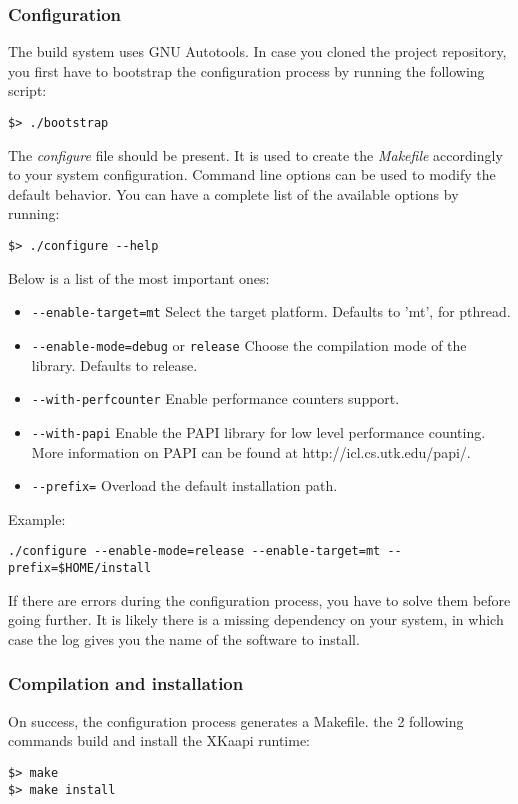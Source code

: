 \documentclass{article}
\begin{document}
\subsubsection{Configuration}
The build system uses GNU Autotools.
In case you cloned the project repository, you first have to bootstrap the
configuration process by running the following script:
\begin{verbatim}
$> ./bootstrap
\end{verbatim}
The \textit{configure} file should be present. It is used to create the
\textit{Makefile} accordingly to your system configuration. Command line
options can be used to modify the default behavior. You can have a complete
list of the available options by running:
\begin{verbatim}
$> ./configure --help
\end{verbatim}
Below is a list of the most important ones:
\begin{itemize} %
\item \verb+--enable-target=mt+\newline
Select the target platform. Defaults to 'mt', for pthread.
\item \verb+--enable-mode=debug+ or \verb+release+\newline
Choose the compilation mode of the library. Defaults to release.
\item \verb+--with-perfcounter+\newline
Enable performance counters support.
\item \verb+--with-papi+\newline
Enable the PAPI library for low level performance counting.
More information on PAPI can be found at http://icl.cs.utk.edu/papi/.
\item \verb+--prefix=+\newline
Overload the default installation path.
\end{itemize} %
Example:
\begin{verbatim}
./configure --enable-mode=release --enable-target=mt --prefix=$HOME/install
\end{verbatim}
If there are errors during the configuration process, you have to solve
them before going further. It is likely there is a missing dependency on your
system, in which case the log gives you the name of the software to install.

\subsubsection{Compilation and installation}
On success, the configuration process generates a Makefile. the 2 following
commands build and install the XKaapi runtime:
\begin{verbatim}
$> make
$> make install
\end{verbatim}
\end{document}
